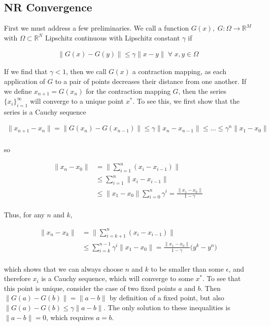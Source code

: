 \documentclass[11pt]{article}
\newcommand{\Forall}{\; \forall \;}
\begin{document}
\subsection{NR Convergence}

First we must address a few preliminaries. We call a function $G(x), \; G: \Omega \rightarrow \mathbb{R}^M$ with $\Omega \subset \mathbb{R}^N$ Lipschitz continuous with Lipschitz constant $\gamma$ if

\begin{align*}
  \| G(x) - G(y) \| \leq \gamma \| x - y \| \Forall x, y \in \Omega
\end{align*}

If we find that $\gamma < 1$, then we call $G(x)$ a contraction mapping, as each application of $G$ to a pair of points decreases their distance from one another. If we define $x_{n+1} = G(x_n)$ for the contraction mapping $G$, then the series $\{x_i\}_{i=1}^\infty$ will converge to a unique point $x^*$. To see this, we first show that the series is a Cauchy sequence

\begin{align*}
  \| x_{n+1} - x_n \| = \| G(x_n) - G(x_{n-1}) \| \leq \gamma \| x_n - x_{n-1} \| \leq \hdots \leq \gamma^n \| x_1 - x_0 \| \\
\end{align*}

so

\begin{align*}
  \| x_n - x_0 \| &= \| \sum \limits_{i=1}^n( x_i - x_{i-1}) \| \\
  &\leq \sum \limits_{i=1}^n \| x_i - x_{i-1} \| \\
  &\leq \| x_1 - x_0 \| \sum \limits_{i=0}^n \gamma^i  = \frac{\| x_1 - x_0 \|}{1 - \gamma} \\
\end{align*}

Thus, for any $n$ and $k$,

\begin{align*}
  \| x_n - x_k \| &= \| \sum \limits_{i=k+1}^n( x_i - x_{i-1}) \| \\
  &\leq \sum \limits_{i=k}^{n-1} \gamma ^{i} \| x_1 - x_0 \| = \frac{\| x_1 - x_0 \|}{1 - \gamma} \bigg( y^k - y^n \bigg) \\
\end{align*}

which shows that we can always choose $n$ and $k$ to be smaller than some $\epsilon$, and therefore $x_i$ is a Cauchy sequence, which will converge to some $x^*$. To see that this point is unique, consider the case of two fixed points $a$ and $b$. Then $\| G(a) - G(b) \| = \| a - b \|$ by definition of a fixed point, but also $\| G(a) - G(b) \leq \gamma \| a - b \|$. The only solution to these inequalities is $\| a - b \| = 0$, which requires $a = b$.
\end{document}
